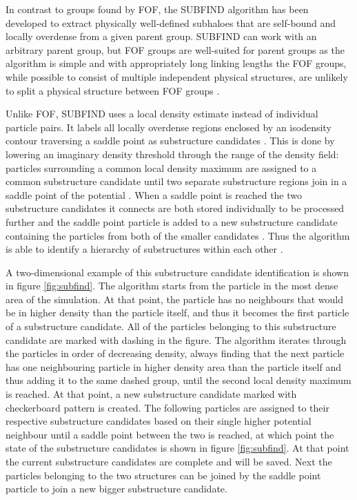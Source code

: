 \documentclass[english, oneside]{HYgradu}
\begin{document}
In contrast to groups found by FOF, the SUBFIND algorithm has been developed to extract physically well-defined subhaloes that are self-bound and locally overdense from a given parent group. SUBFIND can work with an arbitrary parent group, but FOF groups are well-suited for parent groups as the algorithm is simple and with appropriately long linking lengths the FOF groups, while possible to consist of multiple independent physical structures, are unlikely to split a physical structure between FOF groups \citep{springel2001populating}.

Unlike FOF, SUBFIND uses a local density estimate instead of individual particle pairs. It labels all locally overdense regions enclosed by an isodensity contour traversing a saddle point as substructure candidates \citep{springel2001populating}. This is done by lowering an imaginary density threshold through the range of the density field: particles surrounding a common local density maximum are assigned to a common substructure candidate until two separate substructure regions join in a saddle point of the potential \citep{springel2001populating}. When a saddle point is reached the two substructure candidates it connects are both stored individually to be processed further and the saddle point particle is added to a new substructure candidate containing the particles from both of the smaller candidates \citep{springel2001populating}. Thus the algorithm is able to identify a hierarchy of substructures within each other \citep{springel2001populating}.

A two-dimensional example of this substructure candidate identification is shown in figure \ref{fig:subfind}. The algorithm starts from the particle in the most dense area of the simulation. At that point, the particle has no neighbours that would be in higher density than the particle itself, and thus it becomes the first particle of a substructure candidate. All of the particles belonging to this substructure candidate are marked with dashing in the figure. The algorithm iterates through the particles in order of decreasing density, always finding that the next particle has one neighbouring particle in higher density area than the particle itself and thus adding it to the same dashed group, until the second local density maximum is reached. At that point, a new substructure candidate marked with checkerboard pattern is created. The following particles are assigned to their respective substructure candidates based on their single higher potential neighbour until a saddle point between the two is reached, at which point the state of the substructure candidates is shown in figure \ref{fig:subfind}. At that point the current substructure candidates are complete and will be saved. Next the particles belonging to the two structures can be joined by the saddle point particle to join a new bigger substructure candidate.
\end{document}
